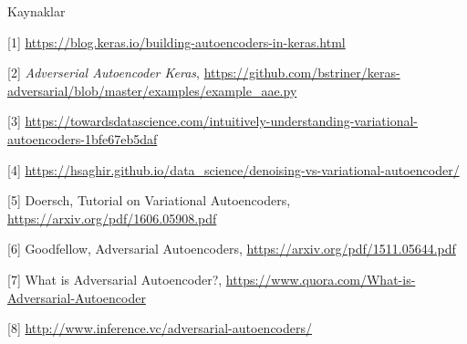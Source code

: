 \documentclass[12pt,fleqn]{article}\usepackage{../../common}
\begin{document}
Kaynaklar

[1] \url{https://blog.keras.io/building-autoencoders-in-keras.html}

[2] {\em Adverserial Autoencoder Keras}, 
    \url{https://github.com/bstriner/keras-adversarial/blob/master/examples/example_aae.py}

[3] \url{https://towardsdatascience.com/intuitively-understanding-variational-autoencoders-1bfe67eb5daf}

[4] \url{https://hsaghir.github.io/data_science/denoising-vs-variational-autoencoder/}

[5] Doersch, Tutorial on Variational Autoencoders, 
    \url{https://arxiv.org/pdf/1606.05908.pdf}

[6] Goodfellow, Adversarial Autoencoders, 
    \url{https://arxiv.org/pdf/1511.05644.pdf}

[7] What is Adversarial Autoencoder?, 
    \url{https://www.quora.com/What-is-Adversarial-Autoencoder}

[8] \url{http://www.inference.vc/adversarial-autoencoders/}
\end{document}
